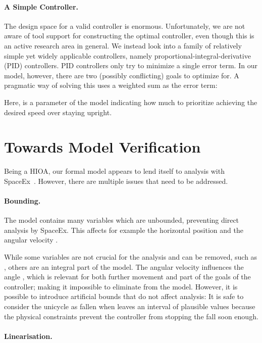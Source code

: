 \documentclass[copyright,submission]{eptcs}
\begin{document}
\paragraph{A Simple Controller.}
The design space for a valid controller is enormous. Unfortunately, we
are not aware of tool support for constructing the optimal controller,
even though this is an active research area in general. We instead
look into a family of relatively simple yet widely applicable controllers,
namely proportional-integral-derivative (PID) controllers.
PID controllers only try to minimize a single
error term. In our model, however, there are two (possibly
conflicting) goals to optimize for. A pragmatic way of solving this
uses a weighted sum as the error term:

Here,  is a parameter of the model indicating how
much to prioritize achieving the desired speed over staying upright.


\section{Towards Model Verification}\label{sect:verification}

Being a HIOA, our formal model appears to lend itself to analysis with
SpaceEx~\cite{DBLP:conf/cav/FrehseGDCRLRGDM11}. However, there are
multiple issues that need to be addressed.


\paragraph{Bounding.}
The model contains many variables which are unbounded, preventing direct analysis by SpaceEx. This affects for example the horizontal position  and the angular velocity .

While some variables are not crucial for the analysis and can be removed, such as , others are an integral part of the model. The angular velocity  influences the angle , which is relevant for both further movement and part of the goals of the controller; making it impossible to eliminate  from the model.
However, it is possible to introduce artificial bounds that do not affect analysis: It is safe to consider the unicycle as fallen when  leaves an interval of plausible values because the physical constraints prevent the controller from stopping the fall soon enough.


\paragraph{Linearisation.}
\end{document}
